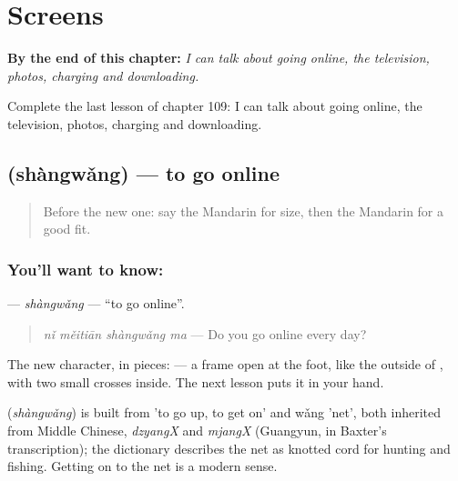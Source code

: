 
\chapter{Screens}
\label{ch:zh-screens}

\begin{chapteropening}
\textbf{By the end of this chapter:} \emph{I can talk about going online, the television, photos, charging and downloading.}

Complete the last lesson of chapter 109: I can talk about going online, the television, photos, charging and downloading.
\end{chapteropening}

\section[\texorpdfstring{\zh{上网} (shàngwǎng)}{上网 (shàngwǎng)}]{ (shàngwǎng) — to go online}

\label{lesson:ZH-C109-shangwang}



\begin{quote}
Before the new one: say the Mandarin for size, then the Mandarin for a good fit.
\end{quote}

\subsection*{You'll want to know: }
\textbf{} — \emph{shàngwǎng} — \textquotedblleft{}to go online\textquotedblright{}.

\begin{quote}
\emph{nǐ měitiān shàngwǎng ma} — Do you go online every day?
\end{quote}

The new character, in pieces:  — a frame open at the foot, like the outside of , with two small crosses inside. The next lesson puts it in your hand.

\begin{cousinweb}
\textbf{} (\emph{shàngwǎng}) is built from  'to go up, to get on' and wǎng 'net', both inherited from Middle Chinese, \emph{dzyangX} and \emph{mjangX} (Guangyun, in Baxter's transcription); the dictionary describes the net as knotted cord for hunting and fishing. Getting on to the net is a modern sense.
\end{cousinweb}

